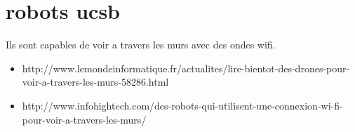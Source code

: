 \documentclass[a4paper,11pt]{report}
\begin{document}
\section{robots ucsb}
Ils sont capables de voir a travers les murs avec des ondes wifi.
\begin{itemize}
  \item http://www.lemondeinformatique.fr/actualites/lire-bientot-des-drones-pour-voir-a-travers-les-murs-58286.html
  \item http://www.infohightech.com/des-robots-qui-utilisent-une-connexion-wi-fi-pour-voir-a-travers-les-murs/
\end{itemize}
\end{document}
